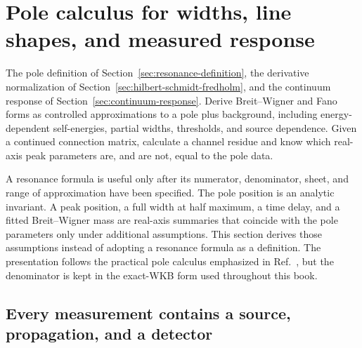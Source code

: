 \section{Pole calculus for widths, line shapes, and measured response}
\label{sec:resonance-formulae}

\calculationroute
  {The pole definition of Section~\ref{sec:resonance-definition}, the
  derivative normalization of
  Section~\ref{sec:hilbert-schmidt-fredholm}, and the continuum response of
  Section~\ref{sec:continuum-response}.}
  {Derive Breit--Wigner and Fano forms as controlled approximations to a pole
  plus background, including energy-dependent self-energies, partial widths,
  thresholds, and source dependence.}
  {Given a continued connection matrix, calculate a channel residue and know
  which real-axis peak parameters are, and are not, equal to the pole data.}

A resonance formula is useful only after its numerator, denominator, sheet,
and range of approximation have been specified.  The pole position is an
analytic invariant.  A peak position, a full width at half maximum, a time
delay, and a fitted Breit--Wigner mass are real-axis summaries that coincide
with the pole parameters only under additional assumptions.  This section
derives those assumptions instead of adopting a resonance formula as a
definition.  The presentation follows the practical pole calculus emphasized
in Ref.~\cite{Kukulin:1989}, but the denominator is kept in the exact-WKB form
used throughout this book.

\subsection{Every measurement contains a source, propagation, and a detector}
\label{subsec:source-propagator-detector}

